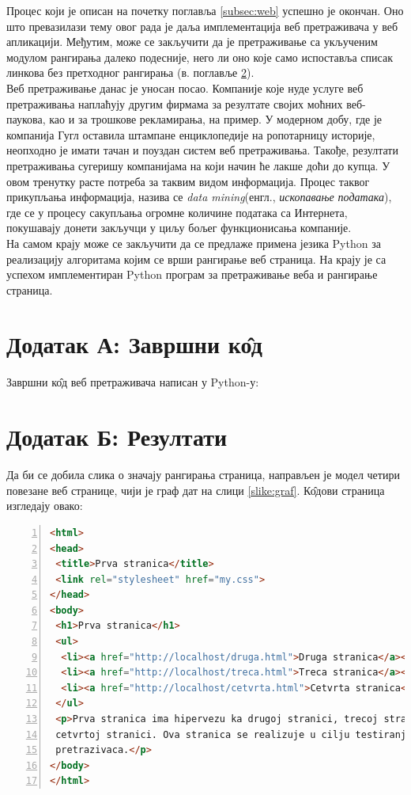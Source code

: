 \documentclass[11pt, serbianc, english, titlepage]{article}
\begin{document}
		Процес који је описан на почетку поглавља \ref{subsec:web} успешно је окончан. Оно што превазилази тему овог рада је даља имплементација веб претраживача у веб апликацији. Међутим, може се закључити да је претраживање са укљученим модулом рангирања далеко подесније, него ли оно које само испоставља списак линкова без претходног рангирања (в. поглавље \ref{sec:dodatakb}).  \\
		Веб претраживање данас је уносан посао. Компаније које нуде услуге веб претраживања наплаћују другим фирмама за резултате својих моћних веб-паукова, као и за трошкове рекламирања, на пример. У модерном добу, где је компанија Гугл оставила штампане енциклопедије на ропотарницу историје, неопходно је имати тачан и поуздан систем веб претраживања. Такође, резултати претраживања сугеришу компанијама на који начин ће лакше доћи до купца. У овом тренутку расте потреба за таквим видом информација. Процес таквог прикупљања информација, назива се \emph{data mining}(енгл., \emph{ископавање података}), где се у процесу сакупљања огромне количине података са Интернета, покушавају донети закључци у циљу бољег функционисања компаније.\\
		На самом крају може се закључити да се предлаже примена језика Python за реализацију алгоритама којим се врши рангирање веб страница. На крају је са успехом имплементиран Python програм за претраживање веба и рангирање страница. 
		\pagebreak
		\section{Додатак А: Завршни к\^{о}д}\label{sec:dodataka}
		Завршни к\^{о}д веб претраживача написан у Python-у:
		
		\pagebreak
		\section{Додатак Б: Резултати}\label{sec:dodatakb}
		Да би се добила слика о значају рангирања страница, направљен је модел четири повезане веб странице, чији је граф дат на слици \ref{slike:graf}. К\^{о}дови страница изгледају овако:\\
		
\begin{lstlisting}[language=HTML, caption=K\^{о}д прве странице, label={lst:prva}, numbers=left]
<html>
<head>
 <title>Prva stranica</title>
 <link rel="stylesheet" href="my.css">
</head>
<body>
 <h1>Prva stranica</h1>
 <ul>
  <li><a href="http://localhost/druga.html">Druga stranica</a></li>
  <li><a href="http://localhost/treca.html">Treca stranica</a></li>
  <li><a href="http://localhost/cetvrta.html">Cetvrta stranica</a></li>
 </ul>
 <p>Prva stranica ima hipervezu ka drugoj stranici, trecoj stranici,
 cetvrtoj stranici. Ova stranica se realizuje u cilju testiranja veb
 pretrazivaca.</p>
</body>
</html>
\end{lstlisting}%
\medskip
\end{document}
